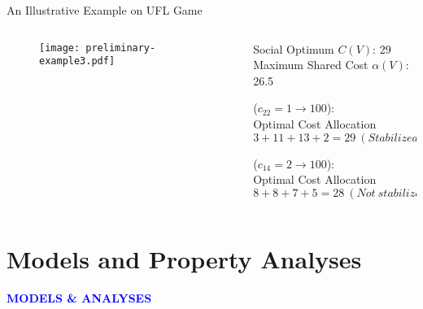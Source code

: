 \documentclass[14pt]{beamer}
\begin{document}
\begin{frame}{An Illustrative Example on UFL Game}
\small
\begin{columns}
\begin{column}{5cm}
\vspace{-15mm}
\begin{figure}[H]
\centering
\centering
\texttt{[image: preliminary-example3.pdf]}
\end{figure}
\end{column}
\begin{column}{6cm}
\vspace{-5mm}
\footnotesize
\begin{shaded}
\centering
Social Optimum $C(V)$: 29\\
\vspace{1mm}
Maximum Shared Cost $\alpha(V)$: 26.5
\end{shaded}
\vspace{-5mm}
\begin{shaded}
\centering
($c_{22}=1 \rightarrow 100$): \\
Optimal Cost Allocation
$$
3+11+13+2=29 ~(Stabilized)
$$
\vspace{-2mm}
\end{shaded}
\vspace{-5mm}
\begin{shaded}
\centering
($c_{14}=2 \rightarrow 100$):\\
 Optimal Cost Allocation
 $$
 8+8+7+5=28 ~(Not ~stabilized)
 $$
\vspace{-5mm}
\end{shaded}
\end{column}
\end{columns}
\end{frame}


\section{Models and Property Analyses}
\begin{frame}
\centering
\large
\textcolor{blue}{\bf {\huge M}ODELS \& {\huge A}NALYSES}
\end{frame}
\end{document}

